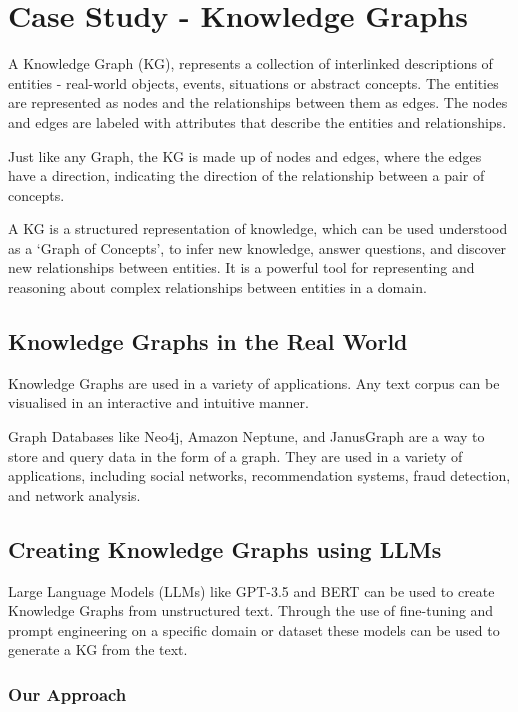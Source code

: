 \chapter{Case Study - Knowledge Graphs}

A Knowledge Graph (KG), represents a collection of interlinked descriptions of entities - real-world objects, events, situations or abstract concepts. The entities are represented as nodes and the relationships between them as edges. The nodes and edges are labeled with attributes that describe the entities and relationships.

Just like any Graph, the KG is made up of nodes and edges, where the edges have a direction, indicating the direction of the relationship between a pair of concepts.

A KG is a structured representation of knowledge, which can be used understood as a `Graph of Concepts', to infer new knowledge, answer questions, and discover new relationships between entities. It is a powerful tool for representing and reasoning about complex relationships between entities in a domain.

\section{Knowledge Graphs in the Real World}

Knowledge Graphs are used in a variety of applications.
Any text corpus can be visualised in an interactive and intuitive
manner.

Graph Databases like Neo4j\cite{n4j}, Amazon Neptune\cite{neptune}, and JanusGraph\cite{janus} are a way to store and query data in the form of a graph. They are used in a variety of applications, including social networks, recommendation systems, fraud detection, and network analysis.

\section{Creating Knowledge Graphs using LLMs}

Large Language Models (LLMs) like GPT-3.5\cite{gpt3} and BERT\cite{bert} can be used to create Knowledge Graphs from unstructured text.
Through the use of fine-tuning and prompt engineering on a specific domain or dataset these models can be used to generate a KG from the text.

\subsection{Our Approach}

